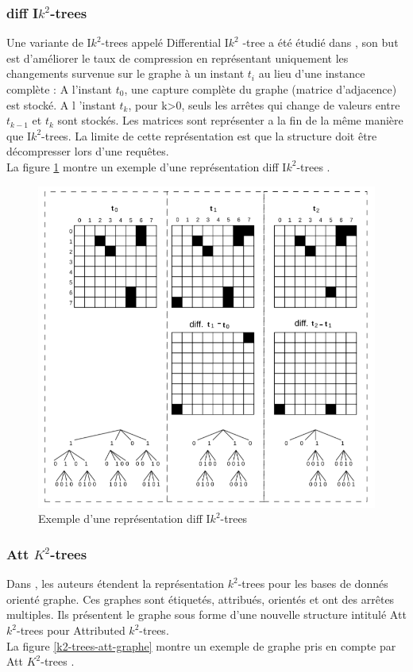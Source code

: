 \subsubsection{diff I$k^2$-trees}
Une variante de I$k^2$-trees appelé Differential I$k^2$
-tree a été étudié dans \citep{alvarez2017succinct}, son but est d'améliorer le taux de compression en représentant uniquement les changements survenue sur le graphe à un instant $t_i$ au lieu d'une instance complète : A l'instant $t_0$, une capture complète du graphe (matrice d'adjacence) est stocké. A l 'instant $t_k$, pour k>0, seuls les arrêtes qui change de valeurs entre $t_{k-1}$ et $t_k$ sont stockés. Les matrices sont représenter a la fin de la même manière que I$k^2$-trees. La limite de cette représentation est que la structure doit être décompresser lors d'une requêtes. \\
La figure \ref{Ik2-trees-diff} montre un exemple d'une représentation diff I$k^2$-trees \citep{alvarez2017succinct}.

\begin{figure}[H]
\begin{center}
\includegraphics[height=200 pt, width=380 pt]{./ressources/image/Ik2-trees-diff.png} 
\end{center}
\caption{Exemple d'une représentation diff I$k^2$-trees}
\label{Ik2-trees-diff}
\end{figure}

\subsubsection{Att $K^2$-trees }
Dans \citep{alvarez2018compact}, les auteurs étendent la représentation $k^2$-trees pour les bases de donnés orienté graphe. Ces graphes sont étiquetés, attribués, orientés et ont des arrêtes multiples. Ils présentent le graphe sous forme d'une nouvelle structure intitulé Att $k^2$-trees pour Attributed $k^2$-trees.\\
La figure \ref{k2-trees-att-graphe} montre un exemple de graphe pris en compte par Att $K^2$-trees \citep{alvarez2018compact}.

